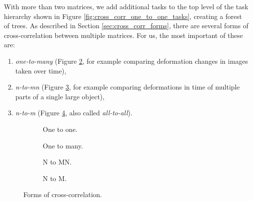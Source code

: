 With more than two matrices, we add additional tasks to the top level of the task hierarchy shown in Figure \ref{fig:cross_corr_one_to_one_tasks}, creating a forest of trees. As described in Section \ref{sec:cross_corr_forms}, there are several forms of cross-correlation between multiple matrices. For us, the most important of these are:
\begin{enumerate}
	\item \textit{one-to-many} (Figure \ref{fig:implementation_one_to_many}, for example comparing deformation changes in images taken over time),
	\item \textit{n-to-mn} (Figure \ref{fig:implementation_n_to_mn}, for example comparing deformations in time of multiple parts of a single large object),
	\item \textit{n-to-m} (Figure \ref{fig:implementation_n_to_m}, also called \textit{all-to-all}).
\end{enumerate}

\begin{figure}
	\centering	
	\begin{subfigure}{0.4\textwidth}
		\centering
		\def\svgwidth{0.5\textwidth}
		
		\caption{One to one.}
		\label{fig:implementation_one_to_one}
	\end{subfigure}
	\hfill
	\begin{subfigure}{0.4\textwidth}
		\centering
		\def\svgwidth{0.5\textwidth}
		
		\caption{One to many.}
		\label{fig:implementation_one_to_many}
	\end{subfigure}
	\hfill
	\begin{subfigure}{0.4\textwidth}
		\centering
		\def\svgwidth{0.7\textwidth}
		
		\caption{N to MN.}
		\label{fig:implementation_n_to_mn}
	\end{subfigure}
	\hfill
	\begin{subfigure}{0.4\textwidth}
		\centering
		\def\svgwidth{0.7\textwidth}
		
		\caption{N to M.}
		\label{fig:implementation_n_to_m}
	\end{subfigure}
	
	\caption{Forms of cross-correlation.}
	\label{fig:implementation_forms}
\end{figure}


